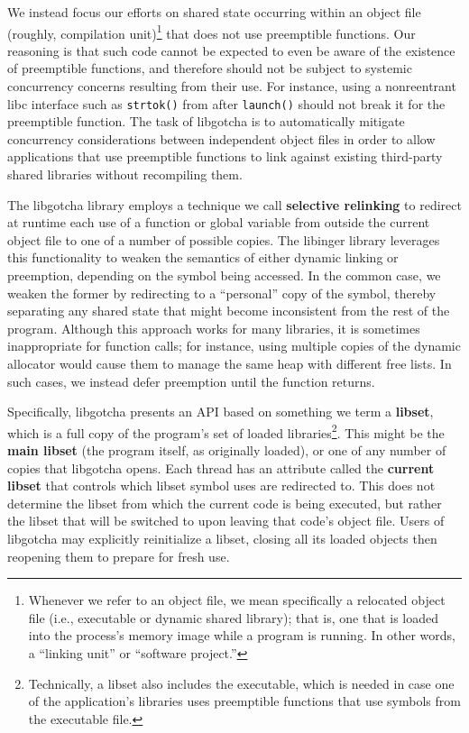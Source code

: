 We instead focus our efforts on shared state occurring within an object file
(roughly, compilation unit)\footnote{Whenever we refer to an object file, we mean
specifically a relocated object file (i.e., executable or dynamic shared library);
that is, one that is loaded into the process's memory image while a program is
running.  In other words, a ``linking unit'' or ``software project.''} that does not
use preemptible functions.  Our reasoning is that such code cannot be expected to
even be aware of the existence of preemptible functions, and therefore should not be
subject to systemic concurrency concerns resulting from their use.  For instance,
using a nonreentrant libc interface such as \texttt{strtok()} from after
\texttt{launch()} should not break it for the preemptible function.  The task of
libgotcha is to automatically mitigate concurrency considerations between independent
object files in order to allow applications that use preemptible functions to link
against existing third-party shared libraries without recompiling them.

The libgotcha library employs a technique we call \textbf{selective
relinking} to redirect at runtime each use of a function or global variable from
outside the current object file to one of a number of possible copies.  The libinger
library leverages this functionality to weaken the semantics of either dynamic
linking or preemption, depending on the symbol being accessed.  In the common case,
we weaken the former by redirecting to a ``personal'' copy of the symbol, thereby
separating any shared state that might become inconsistent from the rest of the
program.  Although this approach works for many libraries, it is sometimes
inappropriate for function calls; for instance, using multiple copies of the dynamic
allocator would cause them to manage the same heap with different free lists.  In
such cases, we instead defer preemption until the function returns.

Specifically, libgotcha presents an API based on something we term a \textbf{libset},
which is a full copy of the program's set of loaded libraries\footnote{Technically, a
libset also includes the executable, which is needed in case one of the application's
libraries uses preemptible functions that use symbols from the executable file.}.
This might be the \textbf{main libset} (the program itself, as originally loaded), or
one of any number of copies that libgotcha opens.  Each thread has an attribute
called the \textbf{current libset} that controls which libset symbol uses are
redirected to.  This does not determine the libset from which the current code is
being executed, but rather the libset that will be switched to upon leaving that
code's object file.  Users of libgotcha may explicitly reinitialize a libset, closing
all its loaded objects then reopening them to prepare for fresh use.

